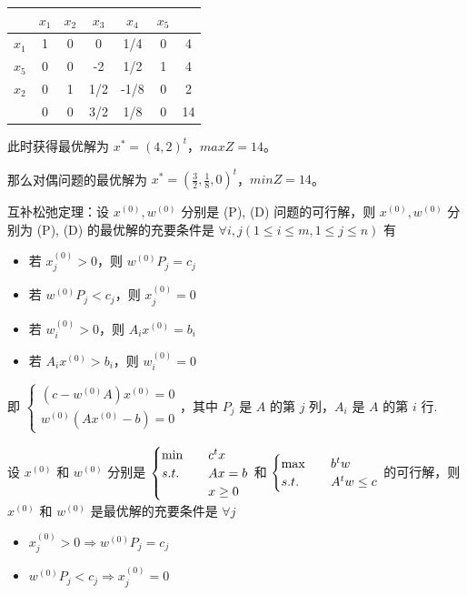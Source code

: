 \begin{example}
\begin{center}
        \begin{tabular}{c|ccccc|c}
            & $x_1$ & $x_2$ & $x_3$ & $x_4$ & $x_5$ & \\
            \hline
            $x_1$ & 1 & 0 & 0 & 1/4 & 0 & 4\\
            $x_5$ & 0 & 0 & -2 & 1/2 & 1 & 4\\
            $x_2$ & 0 & 1 & 1/2 & -1/8 & 0 & 2\\
            \hline
            & 0 & 0 & 3/2 & 1/8 & 0 & 14
        \end{tabular}
    \end{center}
    此时获得最优解为 $x^* = (4, 2)^t$，$maxZ = 14$。

    那么对偶问题的最优解为 $x^* = (\frac{3}{2}, \frac{1}{8}, 0)^t$，$minZ = 14$。
\end{example}

\begin{theorem}[互补松弛定理]
    互补松弛定理：设 $x^{(0)}, w^{(0)}$ 分别是 (P), (D) 问题的可行解，则 $x^{(0)},w^{(0)}$ 分别为 (P), (D) 的最优解的充要条件是 $\forall i, j (1 \le i \le m, 1\le j \le n)$ 有 \begin{itemize}
        \item 若 $x_j^{(0)} > 0$，则 $w^{(0)}P_j = c_j$
        \item 若 $w^{(0)}P_j < c_j$，则 $x_j^{(0)} = 0$
        \item 若 $w_i^{(0)} > 0$，则 $A_ix^{(0)} = b_i$
        \item 若 $A_ix^{(0)} > b_i$，则 $w_i^{(0)} = 0$
    \end{itemize}
    即 $\begin{cases}
        (c - w^{(0)}A)x^{(0)} = 0\\
        w^{(0)}(Ax^{(0)} - b) = 0
    \end{cases}$，其中 $P_j$ 是 $A$ 的第 $j$ 列，$A_i$ 是 $A$ 的第 $i$ 行.
\end{theorem}

\begin{theorem}[互补松弛定理非对称形式]
    \text{}

    设 $x^{(0)}$ 和 $w^{(0)}$ 分别是 $\begin{cases}
        \min \quad & c^tx \\
        s.t. \quad & Ax = b\\
        &x \ge 0
    \end{cases}$ 和 $\begin{cases}
        \max \quad & b^tw \\
        s.t. \quad & A^tw \le c
    \end{cases}$ 的可行解，则 $x^{(0)}$ 和 $w^{(0)}$ 是最优解的充要条件是 $\forall j$ \begin{itemize}
        \item $x_j^{(0)} > 0 \Longrightarrow w^{(0)}P_j = c_j$
        \item $w^{(0)}P_j < c_j \Longrightarrow x_j^{(0)} = 0$
    \end{itemize}
\end{theorem}

